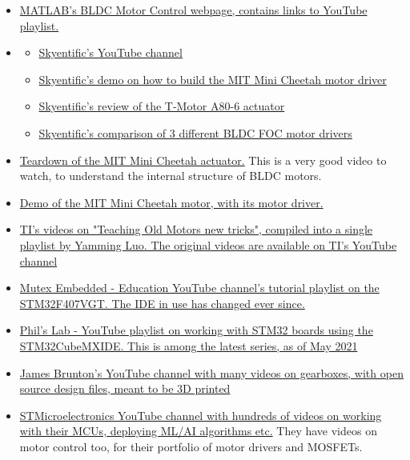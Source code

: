 \documentclass[a4paper]{article}
\begin{document}
		\begin{itemize}
			\item \href{https://in.mathworks.com/solutions/power-electronics-control/bldc-motor-control.html}{MATLAB's BLDC Motor Control webpage, contains links to YouTube playlist.}
			\item \begin{itemize}
				\item \href{https://www.youtube.com/c/Skyentific/videos}{Skyentific's YouTube channel}
				\item \href{https://www.youtube.com/watch?v=WKRLlthr9kY}{Skyentific's demo on how to build the MIT Mini Cheetah motor driver}
				\item \href{https://www.youtube.com/watch?v=HzY9vzgPZkA}{Skyentific's review of the T-Motor A80-6 actuator}
				\item \href{https://www.youtube.com/watch?v=Wb1gsJ4K4pM}{Skyentific's comparison of 3 different BLDC FOC motor drivers}
			\end{itemize}
			\item \href{https://www.youtube.com/watch?v=Mhxz2Bj2RXA}{Teardown of the MIT Mini Cheetah actuator.} This is a very good video to watch, to understand the internal structure of BLDC motors.
			\item \href{https://www.youtube.com/watch?v=Fb6HQNZ4PzQ}{Demo of the MIT Mini Cheetah motor, with its motor driver.}
			\item \href{https://www.youtube.com/playlist?list=PLQFVvDcd2teniWVcMVeDBWkRVxNjirC6K}{TI's videos on "Teaching Old Motors new tricks", compiled into a single playlist by Yamming Luo. The original videos are available on TI's YouTube channel}
			\item \href {https://www.youtube.com/watch?v=uJvPwxa5n00&list=PLfExI9i0v1sn_lQjCFJHrDSpvZ8F2CpkA}{Mutex Embedded - Education YouTube channel's tutorial playlist on the STM32F407VGT. The IDE in use has changed ever since.}
			\item \href{https://www.youtube.com/playlist?list=PLXSyc11qLa1a4Tqbz228dPZfMrs-KRpzA}{Phil's Lab - YouTube playlist on working with STM32 boards using the STM32CubeMXIDE. This is among the latest series, as of May 2021}
			\item \href{https://www.youtube.com/c/jamesbruton/videos}{James Brunton's YouTube channel with many videos on gearboxes, with open source design files, meant to be 3D printed}
			\item \href{https://www.youtube.com/c/stmicroelectronics/playlists}{STMicroelectronics YouTube channel with hundreds of videos on working with their MCUs, deploying ML/AI algorithms etc.} They have videos on motor control too, for their portfolio of motor drivers and MOSFETs.
		\end{itemize}
\end{document}
